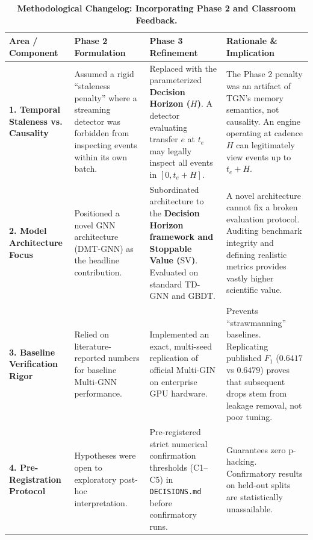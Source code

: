 \documentclass[11pt,a4paper]{article}
\begin{document}
\begin{table}[ht]
\centering
\small
\caption{\textbf{Methodological Changelog: Incorporating Phase 2 and Classroom Feedback.}}
\label{tab:feedback_changelog}
\begin{tabularx}{\textwidth}{L{2.8cm}X X X}
\toprule
\textbf{Area / Component} & \textbf{Phase 2 Formulation} & \textbf{Phase 3 Refinement} & \textbf{Rationale \& Implication} \\
\midrule
\textbf{1. Temporal Staleness vs. Causality} & Assumed a rigid ``staleness penalty'' where a streaming detector was forbidden from inspecting events within its own batch. & Replaced with the parameterized \textbf{Decision Horizon ($H$)}. A detector evaluating transfer $e$ at $t_e$ may legally inspect all events in $[0, t_e + H]$. & The Phase 2 penalty was an artifact of TGN's memory semantics, not causality. An engine operating at cadence $H$ can legitimately view events up to $t_e+H$. \\
\midrule
\textbf{2. Model Architecture Focus} & Positioned a novel GNN architecture (DMT-GNN) as the headline contribution. & Subordinated architecture to the \textbf{Decision Horizon framework and Stoppable Value ($\text{SV}$)}. Evaluated on standard TD-GNN and GBDT. & A novel architecture cannot fix a broken evaluation protocol. Auditing benchmark integrity and defining realistic metrics provides vastly higher scientific value. \\
\midrule
\textbf{3. Baseline Verification Rigor} & Relied on literature-reported numbers for baseline Multi-GNN performance. & Implemented an exact, multi-seed replication of official Multi-GIN on enterprise GPU hardware. & Prevents ``strawmanning'' baselines. Replicating published $F_1$ ($0.6417$ vs $0.6479$) proves that subsequent drops stem from leakage removal, not poor tuning. \\
\midrule
\textbf{4. Pre-Registration Protocol} & Hypotheses were open to exploratory post-hoc interpretation. & Pre-registered strict numerical confirmation thresholds (C1--C5) in \texttt{DECISIONS.md} before confirmatory runs. & Guarantees zero p-hacking. Confirmatory results on held-out splits are statistically unassailable. \\
\bottomrule
\end{tabularx}
\end{table}
\end{document}
